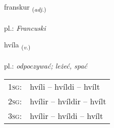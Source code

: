\documentclass[frontgrid, backgrid]{flacards}\usepackage[]{graphicx}\usepackage[]{xcolor}
\begin{document}
\renewcommand{\flhead}{\vskip5pt \fboxsep=0pt {\small\bfseries\footnotesize Lýsingarorð | Adjective}}
\renewcommand{\fcfoot}{\vskip5pt \fboxsep=0pt \hspace{2pt}{\small\bfseries\footnotesize 2K}}

\renewcommand{\blhead}{\vskip5pt {\small\bfseries\footnotesize Lýsingarorð | Adjective }}
\renewcommand{\bcfoot}{\vskip5pt \hspace{2pt}{\small\bfseries\footnotesize 2K}}


{franskur \small{\textsubscript{(\textit{adj.})}} \\[1ex] %
\textphonetic{[franskʏr]} \\
pl.: \emph{Francuski} \\  [2ex]
\renewcommand*{\arraystretch}{0.8}
}

\renewcommand{\flhead}{\vskip5pt \fboxsep=0pt {\small\bfseries\footnotesize Sagnorð | Verb}}
\renewcommand{\fcfoot}{\vskip5pt \fboxsep=0pt \hspace{2pt}{\small\bfseries\footnotesize 2K}}

\renewcommand{\blhead}{\vskip5pt {\small\bfseries\footnotesize Sagnorð | Verb }}
\renewcommand{\bcfoot}{\vskip5pt \hspace{2pt}{\small\bfseries\footnotesize 2K}}


{hvíla \small{\textsubscript{(\textit{v.})}} \\[1ex] %
\textphonetic{[kʰviːla]} \\
pl.: \emph{odpoczywać; leżeć, spać} \\  [2ex]
\renewcommand*{\arraystretch}{0.8}
\begin{tabular}{p{1cm}l}
\textsc{1sg}: & hvíli -- hvíldi -- hvílt \\ 
\textsc{2sg}: & hvílir -- hvíldir -- hvílt \\ 
\textsc{3sg}: & hvílir -- hvíldi -- hvílt \\ 
\end{tabular}
}
\end{document}
